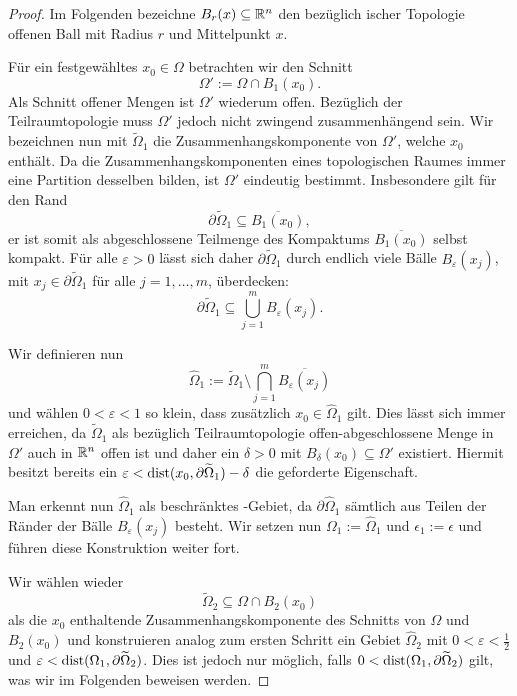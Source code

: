 \begin{proof}
Im Folgenden bezeichne $B_r(x) \subseteq \mathbb{R}^n$ den bezüglich \euklid ischer Topologie offenen Ball mit Radius $r$ und Mittelpunkt $x$.

  Für ein festgewähltes $x_0 \in \Omega$ betrachten wir den Schnitt 
  $$
  \Omega' := \Omega \cap B_1(x_0).
  $$ 
  Als Schnitt offener Mengen ist $\Omega'$ wiederum offen. 
  Bezüglich der Teilraumtopologie muss $\Omega'$ jedoch nicht zwingend zusammenhängend sein.
  Wir bezeichnen nun mit $\widetilde\Omega_1$ die Zusammenhangskomponente von $\Omega'$, welche $x_0$ enthält.
  Da die Zusammenhangskomponenten eines topologischen Raumes immer eine Partition desselben bilden, ist $\Omega'$ eindeutig bestimmt.
  Insbesondere gilt für den Rand
  $$ 
  \partial \widetilde\Omega_1 \subseteq \overline{B_1(x_0)}, 
  $$
  er ist somit als abgeschlossene Teilmenge des Kompaktums $\overline{B_1(x_0)}$ selbst kompakt.
  Für alle $\varepsilon > 0$ lässt sich daher $\partial \widetilde\Omega_1$ durch endlich viele Bälle $B_\varepsilon(x_j)$, mit $x_j \in \partial \widetilde\Omega_1$ für alle $j = 1,\dots,m$, überdecken:
  $$ 
  \partial \widetilde\Omega_1 \subseteq \bigcup_{j = 1}^m B_\varepsilon(x_j).
  $$

  Wir definieren nun 
  $$
  \widehat\Omega_1 := \widetilde\Omega_1 \setminus \bigcap_{j = 1}^m \overline{B_\varepsilon(x_j)}
  $$
  und wählen $0 < \varepsilon < 1$ so klein, dass zusätzlich $x_0 \in \widehat\Omega_1$ gilt. 
  Dies lässt sich immer erreichen, da $\widetilde\Omega_1$ als bezüglich Teilraumtopologie offen-abgeschlossene Menge in $\Omega'$ auch in $\mathbb{R}^n$ offen ist und daher ein $\delta > 0$ mit $B_\delta(x_0) \subseteq \Omega'$ existiert.
  Hiermit besitzt bereits ein $\varepsilon < \operatorname{dist}(x_0, \partial\widetilde\Omega_1) - \delta$ die geforderte Eigenschaft.

  Man erkennt nun $\widehat\Omega_1$ als beschränktes \lipschitz\hyp{}Gebiet, da $\partial\widehat\Omega_1$ sämtlich aus Teilen der Ränder der Bälle $B_\varepsilon(x_j)$ besteht.
  Wir setzen nun $\Omega_1 := \widehat\Omega_1$ und $\epsilon_1 := \epsilon$ und führen diese Konstruktion weiter fort.

  Wir wählen wieder 
  $$
  \widetilde\Omega_2 \subseteq \Omega \cap B_2(x_0)
  $$
  als die $x_0$ enthaltende Zusammenhangskomponente des Schnitts von $\Omega$ und $B_2(x_0)$ und konstruieren analog zum ersten Schritt ein Gebiet $\widehat\Omega_2$ mit $0 < \varepsilon < \tfrac{1}{2}$ und $\varepsilon < \operatorname{dist}(\Omega_1, \partial\widetilde\Omega_2)$.
  Dies ist jedoch nur möglich, falls $0 < \operatorname{dist}(\Omega_1, \partial\widetilde\Omega_2)$ gilt, was wir im Folgenden beweisen werden.


\end{proof}
